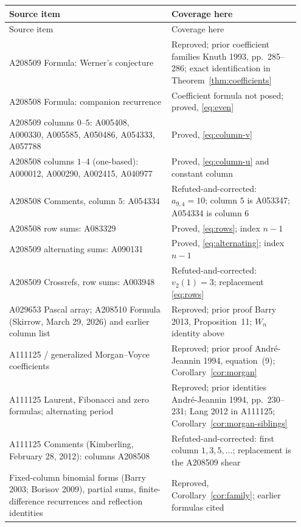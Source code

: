 \documentclass[11pt]{article}
\begin{document}
{\small
\begin{longtable}{@{}>{\raggedright\arraybackslash}p{0.53\linewidth}>{\raggedright\arraybackslash}p{0.42\linewidth}@{}}
\toprule
Source item & Coverage here\\
\midrule
\endfirsthead
\toprule Source item & Coverage here\\\midrule
\endhead
A208509 Formula: Werner's conjecture & Reproved; prior coefficient
families Knuth 1993, pp.~285--286; exact identification in
Theorem~\ref{thm:coefficients}\\
A208508 Formula: companion recurrence & Coefficient formula not posed; proved, \eqref{eq:even}\\
A208509 columns $0$--$5$: A005408, A000330, A005585,
A050486, A054333, A057788 & Proved, \eqref{eq:column-v}\\
A208508 columns $1$--$4$ (one-based): A000012, A000290,
A002415, A040977 & Proved, \eqref{eq:column-u} and constant column\\
A208508 Comments, column $5$: A054334 & Refuted-and-corrected:
$a_{9,4}=10$; column $5$ is A053347; A054334 is column $6$\\
A208508 row sums: A083329 & Proved, \eqref{eq:rows}; index $n-1$\\
A208509 alternating sums: A090131 & Proved, \eqref{eq:alternating}; index $n-1$\\
A208509 Crossrefs, row sums: A003948 & Refuted-and-corrected:
$v_2(1)=3$; replacement \eqref{eq:rows}\\
A029653 Pascal array; A208510 Formula (Skirrow, March 29, 2026)
and earlier column list & Reproved; prior proof Barry 2013,
Proposition~11; $W_n$ identity above\\
A111125 / generalized Morgan--Voyce coefficients & Reproved;
prior proof Andr\'e-Jeannin 1994, equation~(9);
Corollary~\ref{cor:morgan}\\
A111125 Laurent, Fibonacci and zero formulas; alternating period &
Reproved; prior identities Andr\'e-Jeannin 1994, pp.~230--231;
Lang 2012 in A111125; Corollary~\ref{cor:morgan-siblings}\\
A111125 Comments (Kimberling, February 28, 2012): columns A208508 &
Refuted-and-corrected: first column $1,3,5,\ldots$;
replacement is the A208509 shear\\
Fixed-column binomial forms (Barry 2003; Borisov 2009), partial sums,
finite-difference recurrences and reflection identities & Reproved,
Corollary~\ref{cor:family}; earlier formulas cited \cite{columns}\\

\end{longtable}}
\end{document}
